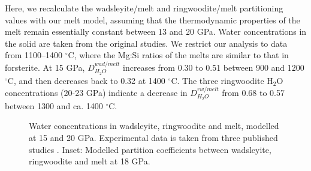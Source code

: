 \documentclass[review]{elsarticle}
\begin{document}
Here, we recalculate the wadsleyite/melt and ringwoodite/melt partitioning values with our melt model, assuming that the thermodynamic properties of the melt remain essentially constant between 13 and 20 GPa. Water concentrations in the solid are taken from the original studies. We restrict our analysis to data from 1100--1400 $^{\circ}$C, where the Mg:Si ratios of the melts are similar to that in forsterite. At 15 GPa, $D^{wad/melt}_{H_2O}$ increases from 0.30 to 0.51 between 900 and 1200 $^{\circ}$C, and then decreases back to 0.32 at 1400 $^{\circ}$C. The three ringwoodite H$_2$O concentrations (20-23 GPa) indicate a decrease in $D^{rw/melt}_{H_2O}$ from 0.68 to 0.57 between 1300 and ca. 1400 $^{\circ}$C.

\begin{figure}[ht!]
  \centering
  \caption{Water concentrations in wadsleyite, ringwoodite and melt, modelled at 15 and 20 GPa. Experimental data is taken from three published studies \citep{OMY2000,DDFK2005,LSOK2011}. Inset: Modelled partition coefficients between wadsleyite, ringwoodite and melt at 18 GPa.}
  \label{fig:partitioning}
\end{figure}
\end{document}
